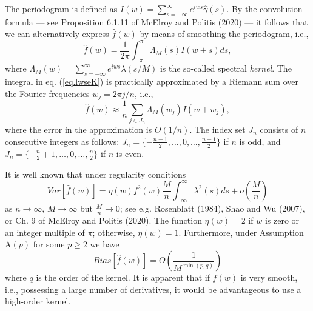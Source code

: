 \documentclass[12p E.Lt,psfig]{article} %
\begin{document}
The periodogram is defined as $I(w)=  \sum_{s=-\infty}^\infty e^{iws} \widehat{ \gamma} (s) $.
  By the convolution formula --- see
Proposition 6.1.11 of McElroy and Politis (2020) --- it follows that we can alternatively express
$\widehat{ f } (w)$ by means of smoothing the periodogram, i.e.,
\begin{equation} \widehat{ f}  (w)=
\frac{1}{2\pi}\int_{-\pi}^\pi   \Lambda_M(s) I(w+s)ds,
\label{eq.lwseK}
\end{equation}
where $\Lambda_M(w)= \sum_{s=-\infty}^\infty e^{iws}\lambda  (s/M)$
is the so-called spectral %
 {\it kernel}.
The integral in eq. (\ref{eq.lwseK}) is practically approximated by a Riemann
sum over the Fourier frequencies $w_j=2\pi j/n$, i.e.,
\begin{equation} \hat f  (w)\approx
\frac{1}{n} \sum_{j\in J_n}    \Lambda_M(w_j) I(w+w_j),
\label{eq.lwseKapprox}
\end{equation}
where the error in the approximation is $O(1/n)$.  The index set $J_n$ consists of $n$
consecutive integers as follows:
$J_n=\{-\frac{n-1}{2},\ldots, 0,\ldots,  \frac{n-1}{2} \}$ if $n$ is odd, and
$J_n=\{-\frac{n}{2}+1,\ldots,0,\ldots,  \frac{n}{2} \}$  if $n$ is even.

It is well known that under regularity conditions
\begin{equation}
Var [ \hat f  (w) ] = \eta (w) f^2(w) \frac{M}{n} \int_{-\infty}^\infty \lambda^2(s)ds + o \left( \frac{M}{n} \right)
\label{eq.fVar}
\end{equation}
as $n\to \infty$, $M\to \infty$ but $\frac{M}{n}\to 0$; see e.g. Rosenblatt  (1984),
 Shao and Wu (2007), or
 Ch. 9 of McElroy and Politis (2020).  The function $\eta (w)=2 $ if $w$ is zero or an integer
multiple of $\pi$; otherwise, $\eta (w)=1 $.  Furthermore, under Assumption A$(p)$ for some $p\geq 2$ we have
\begin{equation}
Bias[ \hat f  (w) ] = O\left(\frac{1}{M^{\min (p,q)}}\right) %
\label{eq.fBias}
\end{equation}
where $q$ is the order of the kernel. It is apparent that if
$f  (w)$ is very smooth, i.e., possessing a large number of derivatives, it would be advantageous
to use a high-order kernel.
\end{document}
